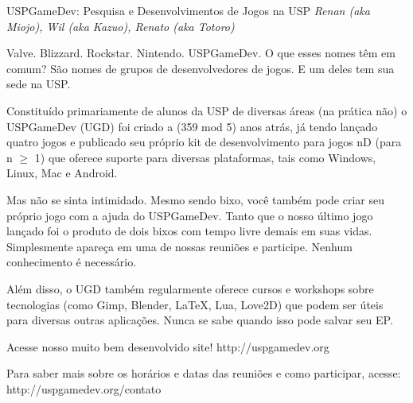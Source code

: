 \begin{secao}{USPGameDev: Pesquisa e Desenvolvimentos de Jogos na USP}
{\em Renan (aka Miojo), Wil (aka Kazuo), Renato (aka Totoro)} %

Valve. Blizzard. Rockstar. Nintendo. USPGameDev. O que esses nomes têm em comum?
São nomes de grupos de desenvolvedores de jogos. E um deles tem sua sede na USP.

Constituído primariamente de alunos da USP de diversas áreas (na prática não) o 
USPGameDev (UGD) foi criado a (359 mod 5) anos atrás, já tendo lançado quatro jogos e 
publicado seu próprio kit de desenvolvimento para jogos nD (para n $\geq$ 1) que 
oferece suporte para diversas plataformas, tais como Windows, Linux, Mac e Android. 

Mas não se sinta intimidado. Mesmo sendo bixo, você também pode criar seu
próprio jogo com a ajuda do USPGameDev. Tanto que o nosso último jogo lançado
foi o produto de dois bixos com tempo livre demais em suas vidas. Simplesmente
apareça em uma de nossas reuniões e participe. Nenhum conhecimento é necessário.

Além disso, o UGD também regularmente oferece cursos e workshops sobre tecnologias
(como Gimp, Blender, LaTeX, Lua, Love2D) que podem ser úteis para
diversas outras aplicações. Nunca se sabe quando isso pode
salvar seu EP.

Acesse nosso muito bem desenvolvido site! 
http://uspgamedev.org

Para saber mais sobre os horários e datas das reuniões e como participar, acesse:
http://uspgamedev.org/contato

\end{secao}



